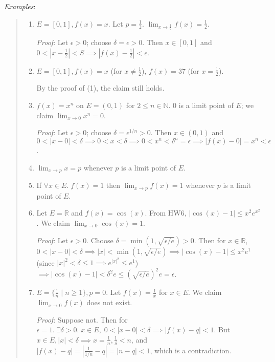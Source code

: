 \documentclass[11pt]{article}
\begin{document}
\emph{Examples}:
\begin{quote}\vspace{-0.3cm}
	\begin{enumerate}
	\item $E = [0,1], f(x) = x$. Let $p = \frac{1}{2}$. $\lim_{x \to \frac{1}{2}} f(x) = \frac{1}{2}$.

	\emph{Proof}: Let $\epsilon > 0$; choose $\delta = \epsilon > 0$. Then $x \in [0,1]$ and $0 < |x-\frac{1}{2}| < S \implies |f(x) - \frac{1}{2}| < \epsilon$.

	\item $E = [0,1], f(x) = x$ (for $x \neq \frac{1}{2}$), $f(x) = 37$ (for $x = \frac{1}{2}$).

	By the proof of (1), the claim still holds.

	\item $f(x) = x^n$ on $E = (0,1)$ for $2 \leq n \in \mathbb{N}$. 0 is a limit point of $E$; we claim $\lim_{x \to 0} x^n = 0$.

	\emph{Proof}: Let $\epsilon > 0$; choose $\delta = \epsilon^{1/n} > 0$. Then $x \in (0,1)$ and $0 < |x-0| < \delta \implies 0 < x < \delta \implies 0 < x^n < \delta^n = \epsilon \implies |f(x) - 0| = x^n < \epsilon$.

	\item $\lim_{x \to p} x = p$ whenever $p$ is a limit point of $E$.

	\item If $\forall x \in E.\; f(x) = 1$ then $\lim_{x \to p} f(x) = 1$ whenever $p$ is a limit point of $E$.

	\item Let $E = \mathbb{R}$ and $f(x) = \cos(x)$. From HW6, $|\cos(x) - 1| \leq x^2 e^{x^2}$. We claim $\lim_{x \to 0} \cos(x) = 1$.

	\emph{Proof}: Let $\epsilon > 0$. Choose $\delta = \min(1, \sqrt{\epsilon/e}) > 0$. Then for $x \in \mathbb{R}$, $0 < |x - 0| < \delta \implies |x| < \min(1, \sqrt{\epsilon/e}) \implies |\cos(x) - 1| \leq x^2 e^1$ (since $|x|^2 < \delta \leq 1 \implies e^{|x|^2} \leq e^1$) $\implies |\cos(x) - 1| < \delta^2 e \leq (\sqrt{\epsilon/e})^2 e = \epsilon$.

	\item $E = \{\frac{1}{n} \mid n \geq 1\}, p=0$. Let $f(x) = \frac{1}{x}$ for $x \in E$. We claim $\lim_{x \to 0} f(x)$ does not exist.

	\emph{Proof}: Suppose not. Then for $\epsilon = 1.\; \exists \delta > 0.\; x \in E,\; 0 < |x - 0| < \delta \implies |f(x) - q| < 1$. But $x \in E, |x| < \delta \implies x = \frac{1}{n}, \frac{1}{\delta} < n$, and $|f(x) - q| = |\frac{1}{1/n} - q| = |n - q| < 1$, which is a contradiction.
	\end{enumerate}
\end{quote}
\end{document}
